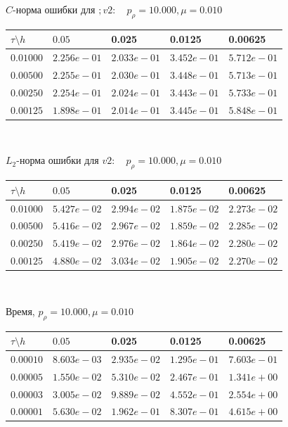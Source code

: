 \documentclass[a4paper, 25pt]{article}
\begin{document}
\begin{center}
 $C$-норма ошибки для $;v2: \quad p_{\rho}=10.000, \mu = 0.010 $
\begin{tabular}{|p{0.6in}|p{0.7in}|p{0.7in}|p{0.7in}|p{0.7in}|} \hline
$\tau\setminus h$ & $0.05$ & 0.025& 0.0125 & 0.00625 \\ \hline
$0.01000$ & $2.256e-01$ &$2.033e-01$ &$3.452e-01$ &$5.712e-01$  \\ \hline
$0.00500$ & $2.255e-01$ &$2.030e-01$ &$3.448e-01$ &$5.713e-01$  \\ \hline
$0.00250$ & $2.254e-01$ &$2.024e-01$ &$3.443e-01$ &$5.733e-01$  \\ \hline
$0.00125$ & $1.898e-01$ &$2.014e-01$ &$3.445e-01$ &$5.848e-01$  \\ \hline
\end{tabular}\\[20pt]
\end{center}

\begin{center}
$L_2$-норма ошибки для $v2: \quad p_{\rho}=10.000, \mu = 0.010  $
\begin{tabular}{|p{0.6in}|p{0.7in}|p{0.7in}|p{0.7in}|p{0.7in}|} \hline
$\tau\setminus h$ & $0.05$ & 0.025& 0.0125 & 0.00625 \\ \hline
$0.01000$ & $5.427e-02$ &$2.994e-02$ &$1.875e-02$ &$2.273e-02$  \\ \hline
$0.00500$ & $5.416e-02$ &$2.967e-02$ &$1.859e-02$ &$2.285e-02$  \\ \hline
$0.00250$ & $5.419e-02$ &$2.976e-02$ &$1.864e-02$ &$2.280e-02$  \\ \hline
$0.00125$ & $4.880e-02$ &$3.034e-02$ &$1.905e-02$ &$2.270e-02$  \\ \hline
\end{tabular}\\[20pt]
\end{center}

\begin{center}
Время, $p_{\rho}=10.000, \mu = 0.010  $
\begin{tabular}{|p{0.6in}|p{0.7in}|p{0.7in}|p{0.7in}|p{0.7in}|} \hline
$\tau\setminus h$ & $0.05$ & 0.025& 0.0125 & 0.00625 \\ \hline
$0.00010$ & $8.603e-03$ &$2.935e-02$ &$1.295e-01$ &$7.603e-01$  \\ \hline
$0.00005$ & $1.550e-02$ &$5.310e-02$ &$2.467e-01$ &$1.341e+00$  \\ \hline
$0.00003$ & $3.005e-02$ &$9.889e-02$ &$4.552e-01$ &$2.554e+00$  \\ \hline
$0.00001$ & $5.630e-02$ &$1.962e-01$ &$8.307e-01$ &$4.615e+00$  \\ \hline
\end{tabular}\\[20pt]
\end{center}
\end{document}
